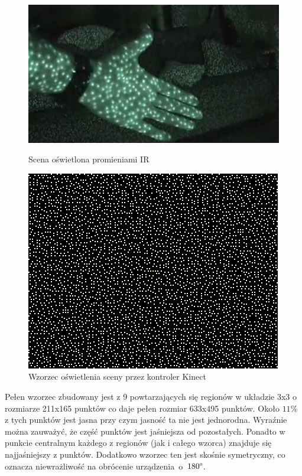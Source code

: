 \begin{figure}
	\centering
	\begin{minipage}[b]{0.48\linewidth}
		\centering   
		\includegraphics[width=\textwidth]{images/kinectNightVision.jpg}	
		\caption{Scena oświetlona promieniami IR\cite{flatley2011}}
		\label{fig:characteristics:kinect:nightVision}
	\end{minipage}
	\begin{minipage}[b]{0.48\linewidth}
		\centering 
		\includegraphics[width=\textwidth]{images/kinect-pattern_3x3.png}
		\caption{Wzorzec oświetlenia sceny przez kontroler Kinect \cite{reichinger2011}}
		\label{fig:characteristics:kinect:dotPattern}
	\end{minipage}	
\end{figure}
		
Pełen wzorzec zbudowany jest z 9 powtarzających się regionów w układzie 3x3 o rozmiarze 211x165 punktów co daje pełen rozmiar 633x495 punktów. Około $11\%$ z tych punktów jest jasna przy czym jasność ta nie jest jednorodna. Wyraźnie można zauważyć, że część punktów jest jaśniejsza od pozostałych. Ponadto w punkcie centralnym każdego z regionów (jak i całego wzorca) znajduje się najjaśniejszy z punktów. Dodatkowo wzorzec ten jest skośnie symetryczny, co oznacza niewrażliwość na obrócenie urządzenia~o~$180\degree$.\\
		
